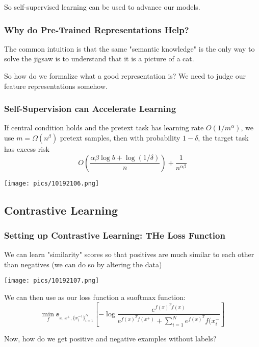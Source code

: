 \documentclass[11pt]{scrartcl}
\begin{document}
So self-supervised learning can be used to advance our models. 

\subsubsection{Why do Pre-Trained Representations Help?}

The common intuition is that the same "semantic knowledge" is the only way to solve the jigsaw is to understand that it is a picture of a cat. 

So how do we formalize what a good representation is? We need to judge our feature representations somehow. 

\subsubsection{Self-Supervision can Accelerate Learning}
\begin{thm}[Robinson et al 2020]
If central condition holds and the pretext task has learning rate $O(1/m^\alpha)$, we use $m=\Omega(n^\beta)$ pretext samples, then with probability $1-\delta$, the target task has excess risk $$O\left(\frac{\alpha\beta\log{b}+\log(1/\delta)}{n}\right)+\frac{1}{n^{\alpha\beta}}$$
\end{thm}
\begin{center}
    \texttt{[image: pics/10192106.png]}
\end{center}

\subsection{Contrastive Learning}
\subsubsection{Setting up Contrastive Learning: THe Loss Function}
We can learn "similarity" scores so that positives are much similar to each other than negatives (we can do so by altering the data)
\begin{center}
    \texttt{[image: pics/10192107.png]}
\end{center}
We can then use as our loss function a suoftmax function: $$\min_{f}\ee_{x,x^{+},\{x_i^{-1}\}_{i=1}^{N}}\left[-\log\frac{e^{f(x)^{T}f(x)}}{e^{f(x)^{T}f(x^{+})}+\sum_{i=1}^{N}e^{f(x)^{T}}f(x_{i}^-}\right]$$

Now, how do we get positive and negative examples without labels? 
\end{document}
